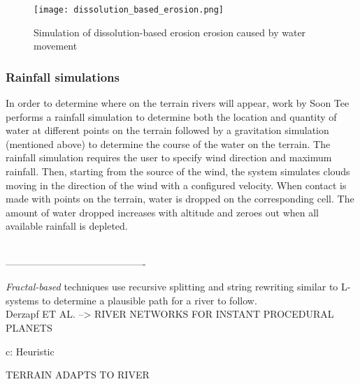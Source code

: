 \begin{figure}[h]
  \centering
	\label{dissolution_based_erosion-based erosion}
	\texttt{[image: dissolution\_based\_erosion.png]}
	\caption{Simulation of dissolution-based erosion erosion caused by water movement\cite{StAva2008}}
\end{figure}

\subsubsection{Rainfall simulations}

In order to determine where on the terrain rivers will appear, work by Soon Tee \cite{Teoh2008} performs a rainfall simulation to determine both the location and quantity of water at different points on the terrain followed by a gravitation simulation (mentioned above) to determine the course of the water on the terrain. The rainfall simulation requires the user to specify wind direction and maximum rainfall. Then, starting from the source of the wind, the system simulates clouds moving in the direction of the wind with a configured velocity. When contact is made with points on the terrain, water is dropped on the corresponding cell. The amount of water dropped increases with altitude and zeroes out when all available rainfall is depleted. 

\\-------------------------------------------

\textit{Fractal-based} techniques use recursive splitting and string rewriting similar to L-systems to determine a plausible path for a river to follow.\\

Derzapf ET AL. --> RIVER NETWORKS FOR INSTANT PROCEDURAL PLANETS

c: Heuristic

TERRAIN ADAPTS TO RIVER

